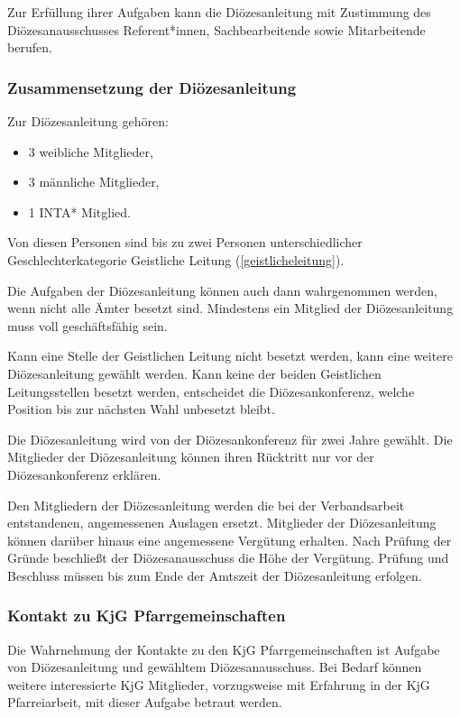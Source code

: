\documentclass[12pt]{report}
\begin{document}
\begin{justify}
Zur Erfüllung ihrer Aufgaben kann die Diözesanleitung mit Zustimmung des Diözesanausschusses
Referent*innen, Sachbearbeitende sowie Mitarbeitende berufen.

\subsubsection{Zusammensetzung der Diözesanleitung}
Zur Diözesanleitung gehören:
\begin{itemize}
	\item 3 weibliche Mitglieder,
	\item 3 männliche Mitglieder,
	\item 1 INTA* Mitglied.
\end{itemize}

Von diesen Personen sind bis zu zwei Personen unterschiedlicher 
Geschlechterkategorie Geistliche Leitung (\ref{geistlicheleitung}).

Die Aufgaben der Diözesanleitung können auch dann wahrgenommen werden, wenn nicht alle
Ämter besetzt sind. Mindestens ein Mitglied der Diözesanleitung muss voll geschäftsfähig sein.

Kann eine Stelle der Geistlichen Leitung nicht besetzt werden, kann eine weitere Diözesanleitung
gewählt werden. Kann keine der beiden Geistlichen Leitungsstellen besetzt werden, entscheidet
die Diözesankonferenz, welche Position bis zur nächsten Wahl unbesetzt bleibt.

Die Diözesanleitung wird von der Diözesankonferenz für zwei Jahre gewählt. Die Mitglieder der
Diözesanleitung können ihren Rücktritt nur vor der Diözesankonferenz erklären.

Den Mitgliedern der Diözesanleitung werden die bei der Verbandsarbeit entstandenen, angemessenen Auslagen
ersetzt. Mitglieder der Diözesanleitung können darüber hinaus eine angemessene Vergütung erhalten. Nach Prüfung der Gründe beschließt der Diözesanausschuss die Höhe der Vergütung. Prüfung und Beschluss müssen bis zum Ende der Amtszeit der Diözesanleitung erfolgen.

\subsubsection{Kontakt zu KjG Pfarrgemeinschaften}
Die Wahrnehmung der Kontakte zu den KjG Pfarrgemeinschaften ist Aufgabe von Diözesanleitung
und gewähltem Diözesanausschuss. Bei Bedarf können weitere interessierte KjG Mitglieder,
vorzugsweise mit Erfahrung in der KjG Pfarreiarbeit, mit dieser Aufgabe betraut werden.


\end{justify}
\end{document}
